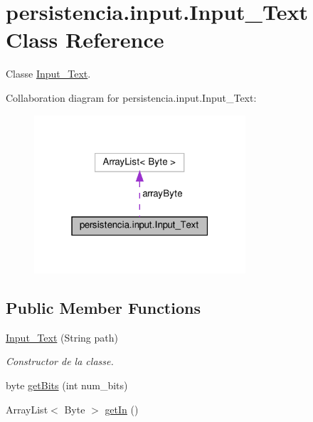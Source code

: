 \hypertarget{classpersistencia_1_1input_1_1Input__Text}{}\section{persistencia.\+input.\+Input\+\_\+\+Text Class Reference}
\label{classpersistencia_1_1input_1_1Input__Text}


Classe \hyperlink{classpersistencia_1_1input_1_1Input__Text}{Input\+\_\+\+Text}.  




Collaboration diagram for persistencia.\+input.\+Input\+\_\+\+Text\+:\nopagebreak
\begin{figure}[H]
\begin{center}
\leavevmode
\includegraphics[width=223pt]{classpersistencia_1_1input_1_1Input__Text__coll__graph}
\end{center}
\end{figure}
\subsection*{Public Member Functions}
\begin{DoxyCompactItemize}
\item 
\hyperlink{classpersistencia_1_1input_1_1Input__Text_a9027dd15a85630115b38369358defd04}{Input\+\_\+\+Text} (String path)
\begin{DoxyCompactList}\small\item\em Constructor de la classe. \end{DoxyCompactList}\item 
byte \hyperlink{classpersistencia_1_1input_1_1Input__Text_a471f357f566d79f224a9cc51967f34ef}{get\+Bits} (int num\+\_\+bits)
\item 
Array\+List$<$ Byte $>$ \hyperlink{classpersistencia_1_1input_1_1Input__Text_a36c0224f7ac8f3a60a80bacc571dd3be}{get\+In} ()
\end{DoxyCompactItemize}


